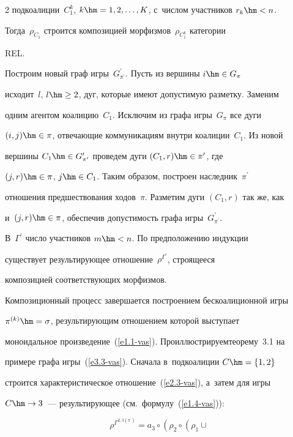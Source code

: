 \begin{multicols}{2}
подкоалиции~$C_1^k$, $k\hm= 1,2,\ldots , K$, с~чис\-лом участников $r_k\hm <n$. 

Тогда~$\rho_{C_1}$ строится композицией морфизмов~$\rho_{C_1^k}$ категории 

REL.

    

    Построим новый граф игры~$G_{\pi^\prime}^\prime$. Пусть из вершины $i\hm\in G_\pi$ 

исходит~$l$, $l\hm\geq 2$, дуг, которые имеют до\-пус\-ти\-мую разметку. Заменим 

одним агентом коалицию~$C_1$. Ис\-клю\-чим из графа игры~$G_\pi$ все дуги 

$(i,j)\hm\in\pi$, от\-ве\-ча\-ющие коммуникациям внут\-ри коалиции~$C_1$. Из новой 

вершины $C_1\hm\in G_{\pi^\prime}^\prime$ проведем дуги $(C_1,r)\hm\in \pi^\prime$, где 

$(j,r)\hm\in \pi$, $j\hm\in C_1$. Таким образом, по\-стро\-ен наследник~$\pi^\prime$ 

отношения предшествования ходов~$\pi$. Разметим дуги $(C_1,r)$ так же, как 

и~$(j,r)\hm\in\pi$, обеспечив до\-пус\-ти\-мость графа игры~$G^\prime_{\pi^\prime}$. 

В~$\Gamma^\prime$ чис\-ло участников $m\hm<n$. По предположению индукции 

существует ре\-зуль\-ти\-ру\-ющее отношение~$\rho^{\Gamma^\prime}$, стро\-яще\-еся 

композицией соответствующих морфизмов. 

    

    Композиционный процесс завершается построением бескоалиционной игры 

$\pi^{(k)} \hm=\sigma$, ре\-зуль\-ти\-ру\-ющим отношением которой выступает 

моноидальное произведение~(\ref{e1.1-vas}). Про\-ил\-люст\-ри\-ру\-ем\linebreak тео\-ре\-му~3.1 на 

примере графа игры~(\ref{e3.3-vas}). Сначала в~подкоалиции $C\hm= \{1,2\}$ 

строится характеристическое отношение~(\ref{e2.3-vas}), а~затем для игры 

$C\hm\to 3$~--- ре\-зуль\-ти\-ру\-ющее (см.\ фор\-му\-лу~(\ref{e1.4-vas})):

    \begin{equation}

    \rho^{\Gamma^{2,3(\pi^\prime)}} =a_3\circ \left(\rho_2\circ \left( \rho_1\cup 


\end{equation}
\end{multicols}
